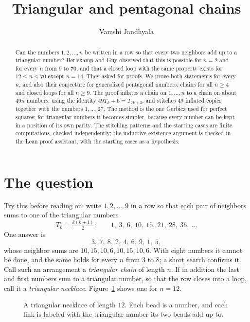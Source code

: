 \documentclass[11pt]{article}
\title{Triangular and pentagonal chains}
\author{Vamshi Jandhyala}
\date{}
\theoremstyle{definition}
\theoremstyle{remark}
\begin{document}
\maketitle
\vspace{-2em}

\begin{abstract}
Can the numbers $1,2,\dots,n$ be written in a row so that every two neighbors add up to a
triangular number? Berlekamp and Guy observed that this is possible for $n=2$ and for every $n$
from $9$ to $70$, and that a closed loop with the same property exists for $12\le n\le 70$
except $n=14$. They asked for proofs. We prove both statements for every $n$, and also their conjecture
for generalized pentagonal numbers: chains for all $n\ge4$ and closed loops for all $n\ge9$. The proof
inflates a chain on $1,\dots,n$ to a chain on about $49n$ numbers, using the identity
$49T_k+6=T_{7k+3}$, and stitches $49$ inflated copies together with the numbers $1,\dots,27$.
The method is the one Gerbicz used for perfect squares; for triangular numbers it becomes
simpler, because every number can be kept in a position of its own parity. The stitching patterns and the starting cases are finite computations, checked independently;
the inductive existence argument is checked in the Lean proof assistant, with the starting cases as a
hypothesis.
\end{abstract}

\section{The question}

Try this before reading on: write $1,2,\dots,9$ in a row so that each pair of neighbors sums to
one of the triangular numbers
\[
  T_k=\tfrac{k(k+1)}{2}\colon\qquad 1,\ 3,\ 6,\ 10,\ 15,\ 21,\ 28,\ 36,\ \dots
\]
One answer is
\[
  3,\ 7,\ 8,\ 2,\ 4,\ 6,\ 9,\ 1,\ 5,
\]
whose neighbor sums are $10,15,10,6,10,15,10,6$. With eight numbers it cannot be done, and the
same holds for every $n$ from $3$ to $8$; a short search confirms it. Call such an arrangement a
\emph{triangular chain} of length $n$. If in addition the last and first numbers sum to a
triangular number, so that the row closes into a loop, call it a \emph{triangular necklace}.
Figure~\ref{fig:necklace} shows one for $n=12$.

\begin{figure}[ht]
\centering
{}
\caption{A triangular necklace of length $12$. Each bead is a number, and each link is labeled
with the triangular number its two beads add up to.}
\label{fig:necklace}
\end{figure}
\end{document}
